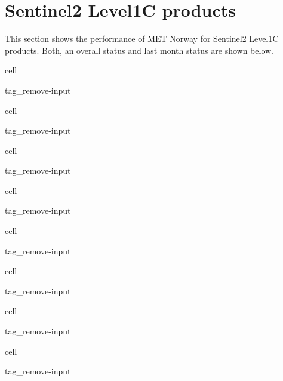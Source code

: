 \documentclass[letterpaper,10pt,english]{jupyterBook}
\begin{document}
\chapter{Sentinel\sphinxhyphen{}2 Level\sphinxhyphen{}1C products}
\label{\detokenize{S2L1C_portals:sentinel-2-level-1c-products}}\label{\detokenize{S2L1C_portals::doc}}
\sphinxAtStartPar
This section shows the performance of MET Norway for Sentinel\sphinxhyphen{}2 Level\sphinxhyphen{}1C products. Both, an overall status and last month status are shown below.

\begin{sphinxuseclass}{cell}
\begin{sphinxuseclass}{tag_remove-input}
\end{sphinxuseclass}
\end{sphinxuseclass}
\begin{sphinxuseclass}{cell}
\begin{sphinxuseclass}{tag_remove-input}
\end{sphinxuseclass}
\end{sphinxuseclass}
\begin{sphinxuseclass}{cell}
\begin{sphinxuseclass}{tag_remove-input}
\end{sphinxuseclass}
\end{sphinxuseclass}
\begin{sphinxuseclass}{cell}
\begin{sphinxuseclass}{tag_remove-input}
\end{sphinxuseclass}
\end{sphinxuseclass}
\begin{sphinxuseclass}{cell}
\begin{sphinxuseclass}{tag_remove-input}
\end{sphinxuseclass}
\end{sphinxuseclass}
\begin{sphinxuseclass}{cell}
\begin{sphinxuseclass}{tag_remove-input}
\end{sphinxuseclass}
\end{sphinxuseclass}
\begin{sphinxuseclass}{cell}
\begin{sphinxuseclass}{tag_remove-input}
\end{sphinxuseclass}
\end{sphinxuseclass}
\begin{sphinxuseclass}{cell}
\begin{sphinxuseclass}{tag_remove-input}
\end{sphinxuseclass}
\end{sphinxuseclass}
\end{document}
